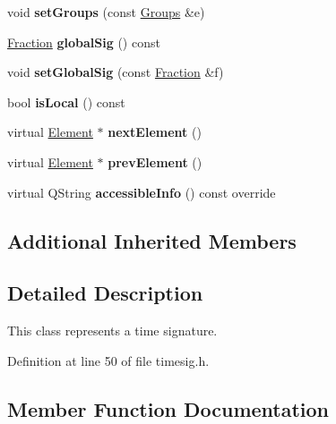 \begin{DoxyCompactItemize}
\item 
\mbox{\label{class_ms_1_1_time_sig_a2a6341a76c74dd31a6589a44c745626d}} 
void {\bfseries set\+Groups} (const \hyperlink{class_ms_1_1_groups}{Groups} \&e)
\item 
\mbox{\label{class_ms_1_1_time_sig_af6c12c3b5094500f3d0975fecaed953c}} 
\hyperlink{class_ms_1_1_fraction}{Fraction} {\bfseries global\+Sig} () const
\item 
\mbox{\label{class_ms_1_1_time_sig_a3c99c8de988e52abb023abf3b67fe1f0}} 
void {\bfseries set\+Global\+Sig} (const \hyperlink{class_ms_1_1_fraction}{Fraction} \&f)
\item 
\mbox{\label{class_ms_1_1_time_sig_abc6843da1c3ab8a38cb4b519f27222c0}} 
bool {\bfseries is\+Local} () const
\item 
\mbox{\label{class_ms_1_1_time_sig_a37c75ebece8fead815655fa222a1ac50}} 
virtual \hyperlink{class_ms_1_1_element}{Element} $\ast$ {\bfseries next\+Element} ()
\item 
\mbox{\label{class_ms_1_1_time_sig_adae9e268f19aa2c371fea2e4754fb87b}} 
virtual \hyperlink{class_ms_1_1_element}{Element} $\ast$ {\bfseries prev\+Element} ()
\item 
\mbox{\label{class_ms_1_1_time_sig_aabaa3c0ef5f5f7b3d33c32f4ae1adfe9}} 
virtual Q\+String {\bfseries accessible\+Info} () const override
\end{DoxyCompactItemize}
\subsection*{Additional Inherited Members}


\subsection{Detailed Description}
This class represents a time signature. 

Definition at line 50 of file timesig.\+h.



\subsection{Member Function Documentation}
\mbox{\label{class_ms_1_1_time_sig_aabc454ee0c8f3f218bbfb6767d6e7212}} 
